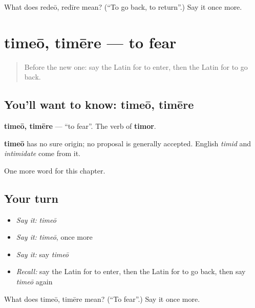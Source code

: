 \begin{tcolorbox}[breakable,colback=teal!4,colframe=teal!35!black,title={Before you move on}]
What does redeō, redīre mean? (\textquotedblleft{}To go back, to return\textquotedblright{}.) Say it once more.
\end{tcolorbox}
\section[timeō, timēre]{timeō, timēre — to fear}

\label{lesson:LA-C78-timeo}



\begin{quote}
Before the new one: say the Latin for to enter, then the Latin for to go back.
\end{quote}

\subsection*{You'll want to know: timeō, timēre}
\textbf{timeō, timēre} — \textquotedblleft{}to fear\textquotedblright{}. The verb of \textbf{timor}.

\begin{cousinweb}
\textbf{timeō} has no sure origin; no proposal is generally accepted. English \emph{timid} and \emph{intimidate} come from it.
\end{cousinweb}

\begin{grammarlens}[title={What you've built}]
One more word for this chapter.
\end{grammarlens}

\subsection*{Your turn}
\begin{itemize}
\raggedright
  \item \emph{Say it:} \emph{timeō}
  \item \emph{Say it:} \emph{timeō}, once more
  \item \emph{Say it:} say \emph{timeō}
  \item \emph{Recall:} say the Latin for to enter, then the Latin for to go back, then say \emph{timeō} again
\end{itemize}

\begin{tcolorbox}[breakable,colback=teal!4,colframe=teal!35!black,title={Before you move on}]
What does timeō, timēre mean? (\textquotedblleft{}To fear\textquotedblright{}.) Say it once more.
\end{tcolorbox}
